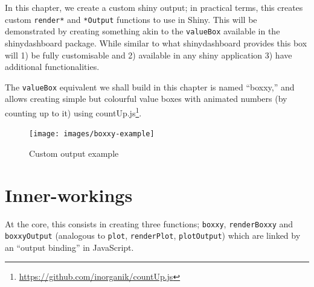 \documentclass[10pt,]{krantz}
\makeatletter
\newenvironment{Shaded}{\begin{snugshade}}{\end{snugshade}}
\newcommand{\ControlFlowTok}[1]{\textcolor[rgb]{0.27,0.27,0.27}{\textbf{#1}}}
\newcommand{\DecValTok}[1]{\textcolor[rgb]{0.06,0.06,0.06}{#1}}
\newcommand{\KeywordTok}[1]{\textcolor[rgb]{0.27,0.27,0.27}{\textbf{#1}}}
\newcommand{\NormalTok}[1]{#1}
\newcommand{\OperatorTok}[1]{\textcolor[rgb]{0.43,0.43,0.43}{\textbf{#1}}}
\newcommand{\StringTok}[1]{\textcolor[rgb]{0.5,0.5,0.5}{#1}}
\renewcommand{\href}[2]{#2\footnote{\url{#1}}}
\newenvironment{kframe}{%
\medskip{}
\setlength{\fboxsep}{.8em}
 \def\at@end@of@kframe{}%
 \ifinner\ifhmode%
  \def\at@end@of@kframe{\end{minipage}}%
  \begin{minipage}{\columnwidth}%
 \fi\fi%
 \def\FrameCommand##1{\hskip\@totalleftmargin \hskip-\fboxsep
 \colorbox{shadecolor}{##1}\hskip-\fboxsep
     \hskip-\linewidth \hskip-\@totalleftmargin \hskip\columnwidth}%
 \MakeFramed {\advance\hsize-\width
   \@totalleftmargin\z@ \linewidth\hsize
   \@setminipage}}%
 {\par\unskip\endMakeFramed%
 \at@end@of@kframe}
\renewenvironment{Shaded}{\begin{kframe}}{\end{kframe}}
\makeatother
\begin{document}
In this chapter, we create a custom shiny output; in practical terms, this creates custom \texttt{render*} and \texttt{*Output} functions to use in Shiny. This will be demonstrated by creating something akin to the \texttt{valueBox} available in the shinydashboard \citep{R-shinydashboard} package. While similar to what shinydashboard provides this box will 1) be fully customisable and 2) available in any shiny application 3) have additional functionalities.

The \texttt{valueBox} equivalent we shall build in this chapter is named ``boxxy,'' and allows creating simple but colourful value boxes with animated numbers (by counting up to it) using \href{https://github.com/inorganik/countUp.js}{countUp.js}.

\begin{Shaded}
\end{Shaded}

\begin{figure}[H]

{\centering \texttt{[image: images/boxxy-example]} 

}

\caption{Custom output example}\label{fig:boxxy-example}
\end{figure}

\hypertarget{shiny-output-inner-workings}{%
\section{Inner-workings}\label{shiny-output-inner-workings}}

At the core, this consists in creating three functions; \texttt{boxxy}, \texttt{renderBoxxy} and \texttt{boxxyOutput} (analogous to \texttt{plot}, \texttt{renderPlot}, \texttt{plotOutput}) which are linked by an ``output binding'' in JavaScript.
\end{document}
